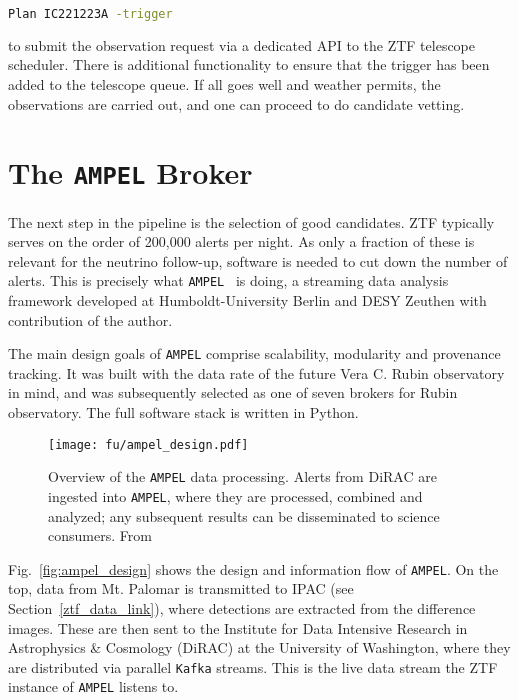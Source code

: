 \begin{lstlisting}[language=bash,style=kaolstplain]
Plan IC221223A -trigger
\end{lstlisting}

to submit the observation request via a dedicated API to the ZTF telescope scheduler. There is additional functionality to ensure that the trigger has been added to the telescope queue. If all goes well and weather permits, the observations are carried out, and one can proceed to do candidate vetting.

\section{The \texttt{AMPEL} Broker}\label{ampel}

The next step in the pipeline is the selection of good candidates. ZTF typically serves on the order of 200,000 alerts per night. As only a fraction of these is relevant for the neutrino follow-up, software is needed to cut down the number of alerts. This is precisely what \texttt{AMPEL}~ is doing, a streaming data analysis framework developed at Humboldt-University Berlin and DESY Zeuthen with contribution of the author.

The main design goals of \texttt{AMPEL} comprise scalability, modularity and provenance tracking. It was built with the data rate of the future Vera C. Rubin observatory~ in mind, and was subsequently selected as one of seven brokers for Rubin observatory. The full software stack is written in Python.

\begin{figure}[h!]
    \texttt{[image: fu/ampel\_design.pdf]}
    \caption[\texttt{AMPEL} overview]{Overview of the \texttt{AMPEL} data processing. Alerts from DiRAC are ingested into \texttt{AMPEL}, where they are processed, combined and analyzed; any subsequent results can be disseminated to science consumers. From~\cite{Nordin2019}}
\end{figure}

Fig.~\ref{fig:ampel_design} shows the design and information flow of \texttt{AMPEL}. On the top, data from Mt. Palomar is transmitted to IPAC (see Section~\ref{ztf_data_link}), where detections are extracted from the difference images. These are then sent to the Institute for Data Intensive Research in Astrophysics \& Cosmology (DiRAC) at the University of Washington, where they are distributed via parallel \texttt{Kafka} streams. This is the live data stream the ZTF instance of \texttt{AMPEL} listens to.

